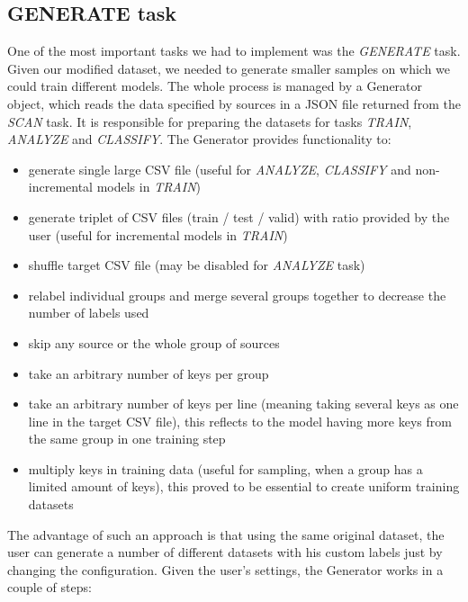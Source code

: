 \subsection{GENERATE task}

One of the most important tasks we had to implement was the \textit{GENERATE} task. Given our modified dataset, we needed to generate smaller samples on which we could train different models. The whole process is managed by a Generator object, which reads the data specified by sources in a JSON file returned from the \textit{SCAN} task. It is responsible for preparing the datasets for tasks \textit{TRAIN}, \textit{ANALYZE} and \textit{CLASSIFY}. The Generator provides functionality to:

\begin{itemize}

\item generate single large CSV file (useful for \textit{ANALYZE}, \textit{CLASSIFY} and non-incremental models in \textit{TRAIN})
\item generate triplet of CSV files (train / test / valid) with ratio provided by the user (useful for incremental models in \textit{TRAIN})
\item shuffle target CSV file (may be disabled for \textit{ANALYZE} task)
\item relabel individual groups and merge several groups together to decrease the number of labels used
\item skip any source or the whole group of sources
\item take an arbitrary number of keys per group
\item take an arbitrary number of keys per line (meaning taking several keys as one line in the target CSV file), this reflects to the model having more keys from the same group in one training step
\item multiply keys in training data (useful for sampling, when a group has a limited amount of keys), this proved to be essential to create uniform training datasets

\end{itemize}

The advantage of such an approach is that using the same original dataset, the user can generate a number of different datasets with his custom labels just by changing the configuration. Given the user's settings, the Generator works in a couple of steps:

